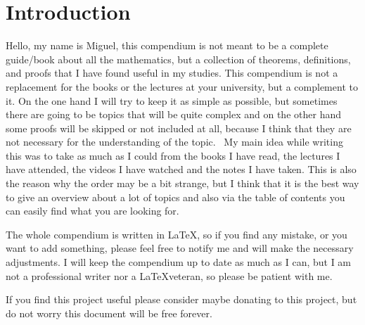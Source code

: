 \newpage
\section{Introduction}

Hello, my name is Miguel, this compendium is not meant to be a complete 
guide/book about all the mathematics,
but a collection of theorems, definitions, and proofs that I have found useful in my studies.
This compendium is not a replacement for the books or the lectures at your university, but a complement to it.
On the one hand I will try to keep it as simple as possible, but sometimes there are going to be topics 
that will be quite 
complex and on the other hand some proofs will be 
skipped or not included at all, because I think that they 
are not necessary for the understanding of the topic.
\vspace{\baselineskip}
\
My main idea while writing this was to take as much as I could from the books I have read, the lectures 
I have attended, the videos I have watched 
and the notes I have taken. This is also the reason why the order may be a bit strange, 
but I think that it is the best way to give an overview about a lot of topics and also 
via the table of contents you can
easily find what you are looking for.
\vspace{\baselineskip}

The whole compendium is written in \LaTeX, so if you find any mistake, or you want to add something, please 
feel free to notify me and will make the necessary adjustments.
I will keep the compendium up to date as much as 
I can, but I am not a professional writer nor a \LaTeX veteran, so please be patient with me.
\vspace{\baselineskip}

If you find this project useful please consider maybe donating
to this project, but do not worry this document will be free forever.
